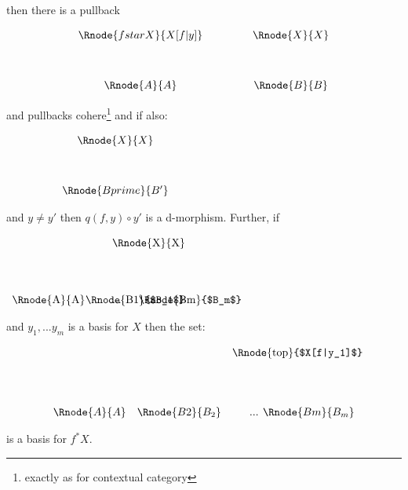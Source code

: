 \documentclass[10pt,a4paper]{article}
\begin{document}
\begin{enumerate} [(i)]
then there is a pullback 
\vspace{3mm}
\begin{center}
\begin{displaymath}
\begin{array}{cp{.9cm}c}
\Rnode{fstarX}{X[f|y]} & & \Rnode{X}{X}\\ [1.2cm]
\Rnode{A}{A}         & & \Rnode{B}{B}
\end{array}
\end{displaymath}
\end{center}
and pullbacks cohere\footnote{exactly as for contextual category}
and if also:
\begin{center}
$
\begin{array}{cp{.9cm}c}
            & & \Rnode{X}{X} \\ [1.2cm]
& & \Rnode{Bprime}{B'} \\
\end{array}
$
\end{center}
and $y \neq y'$ then $q(f,y) \circ y'$ is a d-morphism. 
\noindent Further, if
\begin{center}
$
\begin{array}{p{2cm}p{0.5cm}p{0.5cm}p{0.5cm}}
& & \Rnode{X}{X}& \\ [1.4cm]
\Rnode{A}{A} & \Rnode{B1}{$B_1$} & ... & \Rnode{Bm}{$B_m$}\\
\end{array}
$
\end{center}
and $y_1,...y_m$ is a basis for $X$ 
\noindent then the set:
\vspace{2mm}
\begin{center}
\setlength{\arraycolsep}{0.3cm}
\begin{displaymath}
\begin{array}{ccp{0.2cm}p{0.075cm}c}
&&\Rnode{top}{$X[f|y_1]$}& & \\[1.5cm]
\Rnode{A}{A}&\Rnode{B2}{B_2}&& ... & \Rnode{Bm}{B_m}\\
\end{array}
\end{displaymath}
\end{center}
is a basis for  $f^*X$.



\end{enumerate}
\end{document}
